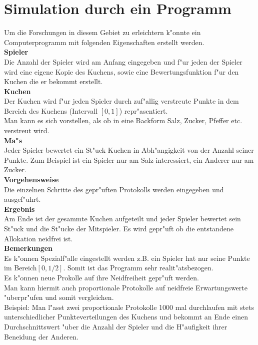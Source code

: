 \documentclass[11pt, a4paper, twoside]{article}
\numberwithin{equation}{section}
\begin{document}
\section{Simulation durch ein Programm}
Um die Forschungen in diesem Gebiet zu erleichtern k"onnte ein Computerprogramm mit folgenden Eigenschaften erstellt werden.\\
\newline
\textbf{Spieler}\\
Die Anzahl der Spieler wird am Anfang eingegeben und f"ur jeden der Spieler wird eine eigene Kopie des Kuchens, sowie eine Bewertungsfunktion f"ur den Kuchen die er bekommt erstellt.\\
\newline
\textbf{Kuchen}\\
Der Kuchen wird f"ur jeden Spieler durch zuf"allig verstreute Punkte in dem Bereich des Kuchens (Intervall $[0,1]$) repr"asentiert.\\ Man kann es sich vorstellen, als ob in eine Backform Salz, Zucker, Pfeffer etc. verstreut wird.\\
\newline 
\textbf{Ma"s}\\
Jeder Spieler bewertet ein St"uck Kuchen in Abh"angigkeit von der Anzahl seiner Punkte. Zum Beispiel ist ein Spieler nur am Salz interessiert, ein Anderer nur am Zucker.\\ 
\newline
\textbf{Vorgehensweise}\\
Die einzelnen Schritte des gepr"uften Protokolls werden eingegeben und ausgef"uhrt.\\
\newline
\textbf{Ergebnis}\\
Am Ende ist der gesammte Kuchen aufgeteilt und jeder Spieler bewertet sein St"uck und die St"ucke der Mitspieler. Es wird gepr"uft ob die entstandene Allokation neidfrei ist.\\
\newline
\textbf{Bemerkungen}\\
Es k"onnen Spezialf"alle eingestellt werden z.B. ein Spieler hat nur seine Punkte im Bereich$[0,1/2]$. Somit ist das Programm sehr realit"atsbezogen.\\
Es k"onnen neue Prokolle auf ihre Neidfreiheit gepr"uft werden.\\
Man kann hiermit auch proportionale Protokolle auf neidfreie Erwartungswerte "uberpr"ufen und somit vergleichen.\\ Beispiel: Man l"asst zwei proportionale Protokolle 1000 mal durchlaufen mit stets unterschiedlicher Punkteverteilungen des Kuchens und bekommt an Ende einen Durchschnittswert "uber die Anzahl der Spieler und die H"aufigkeit ihrer Beneidung der Anderen.\\
\newpage
\end{document}
